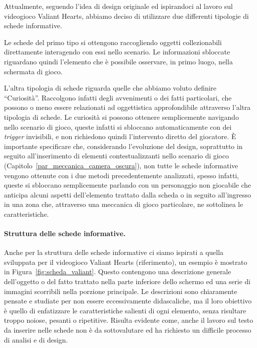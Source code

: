 Attualmente, seguendo l’idea di design originale ed ispirandoci al lavoro sul videogioco Valiant Hearts, abbiamo deciso di utilizzare due differenti tipologie di schede informative.

Le schede del primo tipo si ottengono raccogliendo oggetti collezionabili direttamente interagendo con essi nello scenario. Le informazioni sbloccate riguardano quindi l’elemento che è possibile osservare, in primo luogo, nella schermata di gioco. 

L’altra tipologia di schede riguarda quelle che abbiamo voluto definire “Curiosità”. Raccolgono infatti degli avvenimenti o dei fatti particolari, che possono o meno essere relazionati ad oggettistica approfondibile attraverso l’altra tipologia di schede. Le curiosità si possono ottenere semplicemente navigando nello scenario di gioco, queste infatti si sbloccano automaticamente con dei \textit{trigger} invisibili, e non richiedono quindi l’intervento diretto del giocatore.
È importante specificare che, considerando l’evoluzione del design, soprattutto in seguito all’inserimento di elementi contestualizzanti nello scenario di gioco (Capitolo~\ref{par_meccanica_camera_oscura}), non tutte le schede informative vengono ottenute con i due metodi precedentemente analizzati, spesso infatti, queste si sbloccano semplicemente parlando con un personaggio non giocabile che anticipa alcuni aspetti dell’elemento trattato dalla scheda o in seguito all’ingresso in una zona che, attraverso una meccanica di gioco particolare, ne sottolinea le caratteristiche.

\paragraph{Struttura delle schede informative.}
\label{par:struttura_schede}

Anche per la struttura delle schede informative ci siamo ispirati a quella sviluppata per il videogioco Valiant Hearts (riferimento), un esempio è mostrato in Figura~\ref{fig:scheda_valiant}. Questo contengono una descrizione generale dell’oggetto o del fatto trattato nella parte inferiore dello schermo ed una serie di immagini scorribili nella porzione principale.
Le descrizioni sono chiaramente pensate e studiate per non essere eccessivamente didascaliche, ma il loro obiettivo è quello di enfatizzare le caratteristiche salienti di ogni elemento, senza risultare troppo noiose, pesanti o ripetitive. Risulta evidente come, anche il lavoro sul testo da inserire nelle schede non è da sottovalutare ed ha richiesto un difficile processo di analisi e di design.

